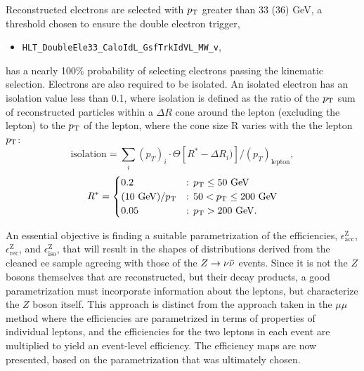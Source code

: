 Reconstructed electrons are selected with $p_{\text{T}}$ greater than 33 (36) GeV, a threshold chosen to ensure the double electron trigger,
\begin{itemize}
  \item \texttt{HLT\_DoubleEle33\_CaloIdL\_GsfTrkIdVL\_MW\_v},
\end{itemize}
has a nearly 100\% probability of selecting electrons passing the kinematic selection. Electrons are also required to be isolated.  An isolated electron has an isolation value less than 0.1,  where isolation is defined as the ratio of the $p_{\text{T}}$ sum of reconstructed particles within a $\Delta R$ cone around the lepton (excluding the lepton) to the $p_{\text{T}}$ of the lepton, where the cone size R varies with the the lepton $p_{\text{T}}$:
\begin{equation}
\text{isolation} = \sum_{i}(p_{T})_i \cdot \Theta[R^*-\Delta R_{i})]/(p_T)_{\text{lepton}},
\label{eq:isolation}
\end{equation}
\[
R^* = 
  \begin{cases} 
  0.2 & \text{: } p_{\text{T}} \leq 50 \text{ GeV} \\
  (10 \text{ GeV})/p_{\text{T}} & \text{: } 50 < p_{\text{T}} \leq 200 \text{ GeV} \\  
   0.05 & \text{: } p_{\text{T}} > 200 \text{ GeV}. \\
  \end{cases}
\]
\noindent 

An essential objective is finding a suitable parametrization of the efficiencies, $\epsilon^{\text{Z}}_{\text{acc}}$, $\epsilon^{\text{Z}}_{\text{rec}}$, and $\epsilon^{\text{Z}}_{\text{iso}}$, that will result in the shapes of distributions derived from the cleaned ee sample agreeing with those of the $Z\rightarrow \nu\bar{\nu}$ events. Since it is not the $Z$ bosons themselves that are reconstructed, but their decay products, a good parametrization must incorporate information about the leptons, but characterize the $Z$ boson itself.  This approach is distinct from the approach taken in the $\mu\mu$ method where the efficiencies are parametrized in terms of properties of individual leptons, and the efficiencies for the two leptons in each event are multiplied to yield an event-level efficiency. The efficiency maps are now presented, based on the parametrization that was ultimately chosen. 

